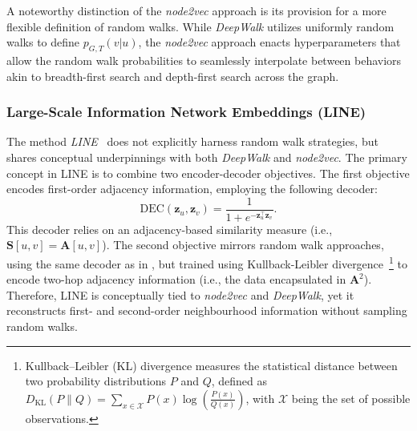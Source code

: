 A noteworthy distinction of the \textit{node2vec} approach is its provision for a more flexible definition of random walks. While \textit{DeepWalk} utilizes uniformly random walks to define $ p_{G,T}(v|u) $, the \textit{node2vec} approach enacts hyperparameters that allow the random walk probabilities to seamlessly interpolate between behaviors akin to breadth-first search and depth-first search across the graph.

\subsubsection{Large-Scale Information Network Embeddings (LINE)}
The method \textit{LINE}~\cite{Tang2015line} does not explicitly harness random walk strategies, but shares conceptual underpinnings with both \textit{DeepWalk} and \textit{node2vec}. The primary concept in LINE is to combine two encoder-decoder objectives. The first objective encodes first-order adjacency information, employing the following decoder:
\begin{equation*}
    \text{DEC}(\mathbf{z}_u, \mathbf{z}_v) = \frac{1}{1 + e^{-\mathbf{z}_u^\top\mathbf{z}_v}}.
\end{equation*}
This decoder relies on an adjacency-based similarity measure (i.e., $ \textbf{S}[u,v] = \mathbf{A}[u,v] $). The second objective mirrors random walk approaches, using the same decoder as in , but trained using Kullback-Leibler divergence~\footnote{Kullback–Leibler (KL) divergence measures the statistical distance between two probability distributions $P$ and $Q$, defined as $ D_{\text{KL}}(P\parallel Q)=\sum_{x\in \mathcal{X}}P(x)\log \left(\frac{P(x)}{Q(x)}\right) $, with $\mathcal{X}$ being the set of possible observations.} to encode two-hop adjacency information (i.e., the data encapsulated in $ \mathbf{A}^2 $). Therefore, LINE is conceptually tied to \textit{node2vec} and \textit{DeepWalk}, yet it reconstructs first- and second-order neighbourhood information without sampling random walks.

